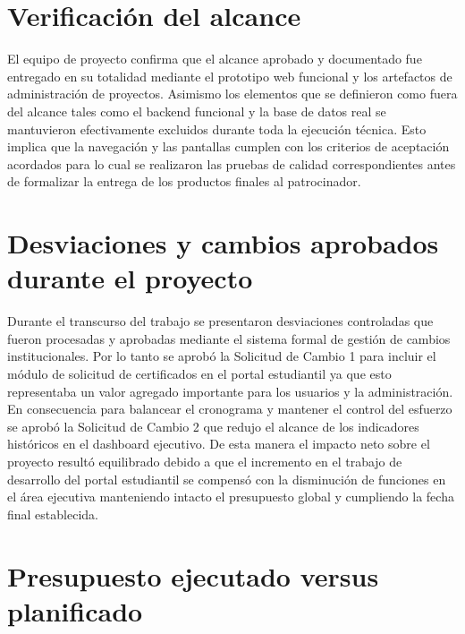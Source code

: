 \documentclass[11pt,spanish]{article}
\begin{document}
\section{Verificación del alcance}

El equipo de proyecto confirma que el alcance aprobado y documentado fue entregado en su totalidad mediante el prototipo web funcional y los artefactos de administración de proyectos. Asimismo los elementos que se definieron como fuera del alcance tales como el backend funcional y la base de datos real se mantuvieron efectivamente excluidos durante toda la ejecución técnica. Esto implica que la navegación y las pantallas cumplen con los criterios de aceptación acordados para lo cual se realizaron las pruebas de calidad correspondientes antes de formalizar la entrega de los productos finales al patrocinador.

\section{Desviaciones y cambios aprobados durante el proyecto}

Durante el transcurso del trabajo se presentaron desviaciones controladas que fueron procesadas y aprobadas mediante el sistema formal de gestión de cambios institucionales. Por lo tanto se aprobó la Solicitud de Cambio 1 para incluir el módulo de solicitud de certificados en el portal estudiantil ya que esto representaba un valor agregado importante para los usuarios y la administración. En consecuencia para balancear el cronograma y mantener el control del esfuerzo se aprobó la Solicitud de Cambio 2 que redujo el alcance de los indicadores históricos en el dashboard ejecutivo. De esta manera el impacto neto sobre el proyecto resultó equilibrado debido a que el incremento en el trabajo de desarrollo del portal estudiantil se compensó con la disminución de funciones en el área ejecutiva manteniendo intacto el presupuesto global y cumpliendo la fecha final establecida.

\section{Presupuesto ejecutado versus planificado}
\end{document}
